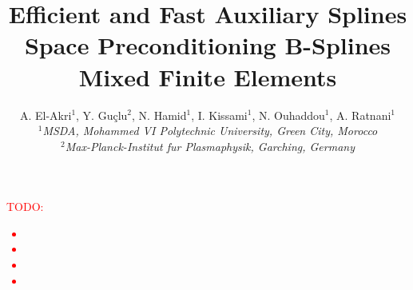 \documentclass[11pt]{article}
\title{Efficient and Fast Auxiliary Splines Space Preconditioning B-Splines Mixed Finite Elements}
\author{A. El-Akri$^{1}$, Y. Gu\c{c}lu$^{2}$, N. Hamid$^{1}$, I. Kissami$^{1}$, N. Ouhaddou$^{1}$, A. Ratnani$^{1}$ 
\\
\small{\textit{$^1$MSDA, Mohammed VI Polytechnic University, Green City, Morocco}}
\\
\small{\textit{$^2$Max-Planck-Institut fur Plasmaphysik, Garching, Germany}}
}
\begin{document}
\maketitle

\begin{abstract}

\end{abstract}

\textcolor{red}{TODO: 
  \begin{itemize}
    \item   
    \item   
    \item   
    \item   
  \end{itemize}
}

\newpage
\tableofcontents
\newpage





\clearpage



\newpage


\clearpage
\newpage



%
\end{document}
